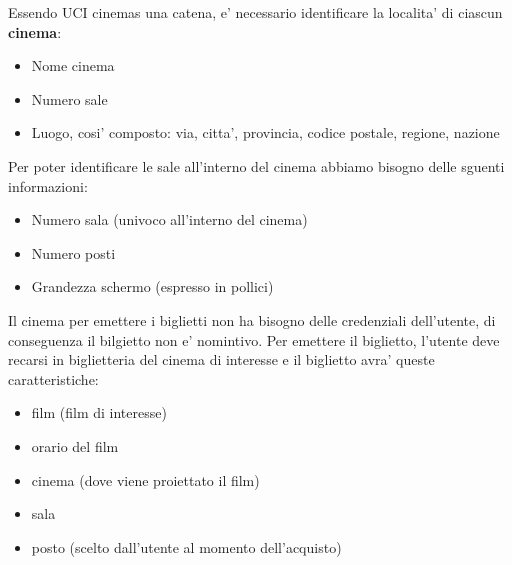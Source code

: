 \documentclass[10pt]{article}
\begin{document}
	Essendo UCI cinemas una catena, e' necessario identificare la localita' di ciascun {\bf cinema}:
	\begin{itemize}
		\item Nome cinema
		\item Numero sale
		\item Luogo, cosi' composto: via, citta', provincia, codice postale, regione, nazione
	\end{itemize}
	Per poter identificare le {\br sale} all'interno del cinema abbiamo bisogno delle sguenti informazioni:
	\begin{itemize}
		\item Numero sala (univoco all'interno del cinema)
		\item Numero posti
		\item Grandezza schermo (espresso in pollici)
	\end{itemize}
	Il cinema per emettere i biglietti non ha bisogno delle credenziali dell'utente, di conseguenza il bilgietto non e' nomintivo. Per emettere il biglietto, l'utente deve recarsi in biglietteria del cinema di interesse e il biglietto avra' queste caratteristiche:
	\begin{itemize}		
		\item film (film di interesse)
		\item orario del film
		\item cinema (dove viene proiettato il film)
		\item sala
		\item posto (scelto dall'utente al momento dell'acquisto)
	\end{itemize}
	
		
	
\end{document}
